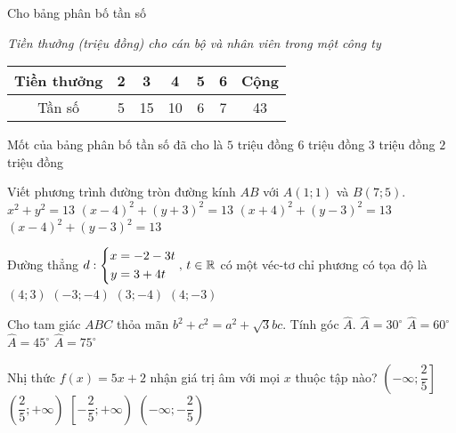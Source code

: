 \begin{ex}%
Cho bảng phân bố tần số\\
\centerline{\it Tiền thưởng (triệu đồng) cho cán bộ và nhân viên trong một công ty}
\begin{center}
\begin{tabular}{|c|c|c|c|c|c|c|}
\hline 
Tiền thưởng & 2 & 3 & 4 & 5 & 6 & Cộng\\ 
\hline 
Tần số & 5 & 15 & 10 & 6 & 7 & 43\\ 
\hline 
\end{tabular} 
\end{center}
Mốt của bảng phân bố tần số đã cho là
\choice
{$5$ triệu đồng}
{$6$ triệu đồng}
{\True $3$ triệu đồng}
{$2$ triệu đồng}
\end{ex}

\begin{ex}%
Viết phương trình đường tròn đường kính $AB$ với $A(1;1)$ và $B(7;5)$.
\choice
{$x^2+y^2=13$}
{$(x-4)^2+(y+3)^2=13$}
{$(x+4)^2+(y-3)^2=13$}
{\True $(x-4)^2+(y-3)^2=13$}
\end{ex}

\begin{ex}%
Đường thẳng $d:\left\{\begin{aligned}x&=-2-3t\\ y&=3+4t\end{aligned}\right.,\, t\in\mathbb{R}$ có một véc-tơ chỉ phương có tọa độ là
\choice
{$(4;3)$}
{$(-3;-4)$}
{\True $(3;-4)$}
{$(4;-3)$}	
\end{ex}

\begin{ex}%
Cho tam giác $ABC$ thỏa mãn $b^2+c^2=a^2+\sqrt{3}bc$. Tính góc $\widehat{A}$.
\choice
{\True $\widehat{A}=30^{\circ}$}
{$\widehat{A}=60^{\circ}$}
{$\widehat{A}=45^{\circ}$}
{$\widehat{A}=75^{\circ}$}	
\end{ex}

\begin{ex}%
Nhị thức $f(x)=5x+2$ nhận giá trị âm với mọi $x$ thuộc tập nào?
\choice
{$\left(-\infty;\dfrac{2}{5}\right]$}
{$\left(\dfrac{2}{5};+\infty\right)$}
{$\left[-\dfrac{2}{5};+\infty\right)$}
{\True $\left(-\infty;-\dfrac{2}{5}\right)$}	
\end{ex}



